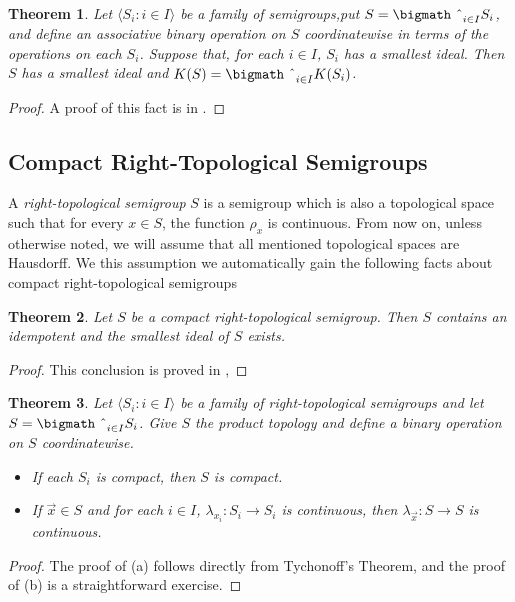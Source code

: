 \documentclass[12pt]{article}
\theoremstyle{plain}
\newtheorem{thm}{Theorem}[section]
\theoremstyle{definition}
\newcommand{\la}{\langle}
\newcommand{\ra}{\rangle}
\newcommand{\bigtimes}{\hbox{\bigmath \char'2}}
\begin{document}
\begin{thm}
  Let $\la S_i : i \in I \ra$ be a family of semigroups,put $S =
  \bigtimes_{i \in I} S_i$, and define an associative binary operation
  on $S$ coordinatewise in terms of the operations on each $S_i$.
  Suppose that, for each $i \in I$, $S_i$ has a smallest ideal.
  Then $S$ has a smallest ideal and $K(S) = \bigtimes_{i \in I}
  K(S_i)$. 
\end{thm}
\begin{proof}
  A proof of this fact is in \cite[Theorem 2.23]{Hindman:1998fk}.
\end{proof}

\subsection{Compact Right-Topological Semigroups}
A \textsl{right-topological semigroup} $S$ is a semigroup which is
also a topological space such that for every $x \in S$, the function
$\rho_x$ is continuous. 
From now on, unless otherwise noted, we will assume that all mentioned
topological spaces are Hausdorff. 
We this assumption we automatically gain the following facts about
compact right-topological semigroups

\begin{thm}
  \label{thm:IdK_S}
  Let $S$ be a compact right-topological semigroup.
  Then $S$ contains an idempotent and the smallest ideal of $S$ exists.
\end{thm}
\begin{proof}
  This conclusion is proved in \cite[Theorem2.5]{Hindman:1998fk}
  \cite[Theorem 2.8]{Hindman:1998fk},
\end{proof}

\begin{thm}
  Let $\la S_i : i \in I \ra$ be a family of right-topological
  semigroups and let $S = \bigtimes_{i \in I} S_i$.
  Give $S$ the product topology and define a binary operation on $S$
  coordinatewise. 
  \begin{itemize}
    \item[(a)] If each $S_i$ is compact, then $S$ is compact.

    \item[(b)] If $\vec{x} \in S$ and for each $i \in I$,
      $\lambda_{x_i} \colon S_i \to S_i$ is continuous, then
      $\lambda_{\vec{x}} \colon S \to S$ is continuous.
  \end{itemize}
\end{thm}
\begin{proof}
  The proof of (a) follows directly from Tychonoff's Theorem,
  and the proof of (b) is a straightforward exercise.
\end{proof}
\end{document}
